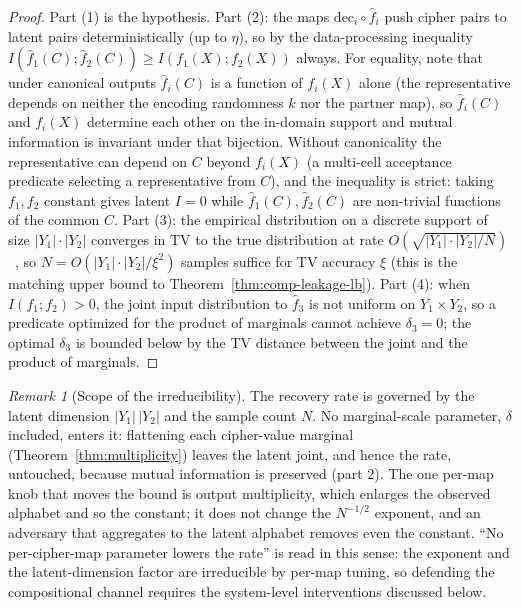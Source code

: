 \documentclass[conference]{IEEEtran}
\theoremstyle{definition}
\theoremstyle{plain}
\theoremstyle{remark}
\newtheorem{remark}{Remark}[section]
\newcommand{\fhat}{\hat{f}}
\newcommand{\dec}{\mathrm{dec}}
\begin{document}
\begin{proof}
Part (1) is the hypothesis.
Part (2): the maps $\dec_i \circ \fhat_i$ push cipher pairs to latent
pairs deterministically (up to $\eta$), so by the data-processing
inequality $I(\fhat_1(C); \fhat_2(C)) \geq I(f_1(X); f_2(X))$ always.
For equality, note that under canonical outputs $\fhat_i(C)$ is a
function of $f_i(X)$ alone (the representative depends on neither the
encoding randomness $k$ nor the partner map), so $\fhat_i(C)$ and
$f_i(X)$ determine each other on the in-domain support and mutual
information is invariant under that bijection.  Without canonicality the
representative can depend on $C$ beyond $f_i(X)$ (a multi-cell acceptance
predicate selecting a representative from $C$), and the inequality is
strict: taking $f_1, f_2$ constant gives latent $I = 0$ while
$\fhat_1(C), \fhat_2(C)$ are non-trivial functions of the common $C$.
Part (3): the empirical distribution on a discrete support of size
$|Y_1| \cdot |Y_2|$ converges in TV to the true distribution at rate
$O(\sqrt{|Y_1|\cdot|Y_2|/N})$~\cite{devroye1996nonparametric}, so
$N = O(|Y_1|\cdot|Y_2|/\xi^2)$ samples suffice for TV accuracy $\xi$
(this is the matching upper bound to Theorem~\ref{thm:comp-leakage-lb}).
Part (4): when $I(f_1; f_2) > 0$, the joint input distribution to
$\fhat_3$ is not uniform on $Y_1 \times Y_2$, so a predicate optimized
for the product of marginals cannot achieve $\delta_3 = 0$; the
optimal $\delta_3$ is bounded below by the TV distance between the
joint and the product of marginals.
\end{proof}

\begin{remark}[Scope of the irreducibility]
\label{rem:irreducibility}
The recovery rate is governed by the latent dimension $|Y_1|\,|Y_2|$ and
the sample count $N$.  No marginal-scale parameter, $\delta$ included,
enters it: flattening each cipher-value marginal
(Theorem~\ref{thm:multiplicity}) leaves the latent joint, and hence the
rate, untouched, because mutual information is preserved (part 2).  The
one per-map knob that moves the bound is output multiplicity, which
enlarges the observed alphabet and so the constant; it does not change
the $N^{-1/2}$ exponent, and an adversary that aggregates to the latent
alphabet removes even the constant.  ``No per-cipher-map parameter lowers
the rate'' is read in this sense: the exponent and the latent-dimension
factor are irreducible by per-map tuning, so defending the compositional
channel requires the system-level interventions discussed below.
\end{remark}
\end{document}
